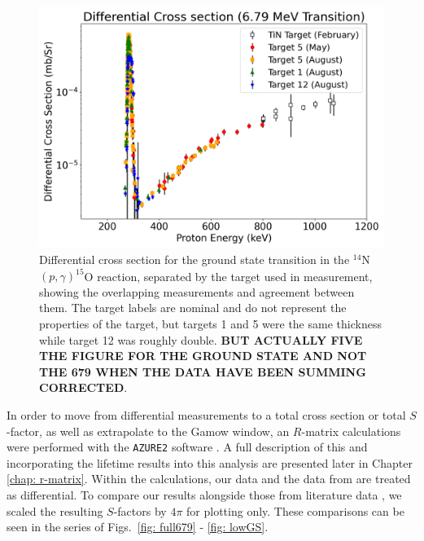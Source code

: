 \begin{figure}
		\includegraphics[width=1.0\linewidth]{figures/cs679_targs.png}
	\caption{Differential cross section for the ground state transition in the $^{14}$N$\left( p,\gamma \right) ^{15}$O reaction, separated by the target used in measurement, showing the overlapping measurements and agreement between them. The target labels are nominal and do not represent the properties of the target, but targets 1 and 5 were the same thickness while target 12 was roughly double. \textbf{BUT ACTUALLY FIVE THE FIGURE FOR THE GROUND STATE AND NOT THE 679 WHEN THE DATA HAVE BEEN SUMMING CORRECTED}.}
	\label{fig: cs679_targs}
\end{figure}




In order to move from differential measurements to a total cross section or total $S$-factor, as well as extrapolate to the Gamow window, an $R$-matrix calculations were performed with the \texttt{AZURE2} software \cite{Azuma2010}. A full description of this and incorporating the lifetime results into this analysis are presented later in Chapter \ref{chap: r-matrix}. Within the calculations, our data and the data from \citet{Li2016} are treated as differential. To compare our results alongside those from literature data \cite{Schroder1987, Imbriani2005, Runkle2005, Li2016, Wagner2018}, we scaled the resulting $S$-factors by $4\pi$ for plotting only.  These comparisons can be seen in the series of Figs.\ \ref{fig: full679} - \ref{fig: lowGS}. 


